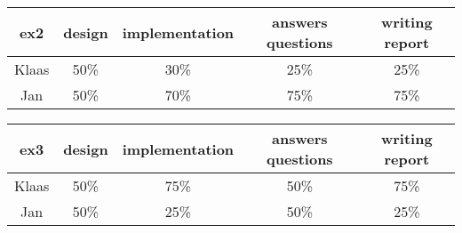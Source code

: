 \documentclass[a4paper]{article}
\begin{document}
\begin{table}[H]
\centering
\begin{tabular}{ccccc}
ex2 & design & implementation & answers questions & writing report \\
\hline
Klaas & 50\% & 30\% & 25\% & 25\% \\
\hline
Jan & 50\% & 70\% & 75\% & 75\% \\
\end{tabular}
\end{table}

\begin{table}[H]
\centering
\begin{tabular}{ccccc}
ex3 & design & implementation & answers questions & writing report \\
\hline
Klaas & 50\% & 75\% & 50\% & 75\% \\
\hline
Jan & 50\% & 25\% & 50\% & 25\% \\
\end{tabular}
\end{table} 
\end{document}
